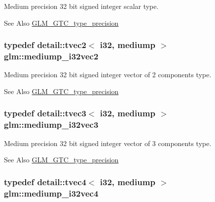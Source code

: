 Medium precision 32 bit signed integer scalar type. \begin{DoxySeeAlso}{See Also}
\hyperlink{group__gtc__type__precision}{G\-L\-M\-\_\-\-G\-T\-C\-\_\-type\-\_\-precision} 
\end{DoxySeeAlso}
\hypertarget{group__gtc__type__precision_gaef7b37956ce9e1cc4faecf21b7fdae8b}{
\subsubsection[{mediump\-\_\-i32vec2}]{\setlength{\rightskip}{0pt plus 5cm}typedef detail\-::tvec2$<$ i32, mediump $>$ {\bf glm\-::mediump\-\_\-i32vec2}}}\label{group__gtc__type__precision_gaef7b37956ce9e1cc4faecf21b7fdae8b}
Medium precision 32 bit signed integer vector of 2 components type. \begin{DoxySeeAlso}{See Also}
\hyperlink{group__gtc__type__precision}{G\-L\-M\-\_\-\-G\-T\-C\-\_\-type\-\_\-precision} 
\end{DoxySeeAlso}
\hypertarget{group__gtc__type__precision_ga768e62b66086bd85a438341eedfad651}{
\subsubsection[{mediump\-\_\-i32vec3}]{\setlength{\rightskip}{0pt plus 5cm}typedef detail\-::tvec3$<$ i32, mediump $>$ {\bf glm\-::mediump\-\_\-i32vec3}}}\label{group__gtc__type__precision_ga768e62b66086bd85a438341eedfad651}
Medium precision 32 bit signed integer vector of 3 components type. \begin{DoxySeeAlso}{See Also}
\hyperlink{group__gtc__type__precision}{G\-L\-M\-\_\-\-G\-T\-C\-\_\-type\-\_\-precision} 
\end{DoxySeeAlso}
\hypertarget{group__gtc__type__precision_ga68126328090f37655d8218c5a5fb8ae5}{
\subsubsection[{mediump\-\_\-i32vec4}]{\setlength{\rightskip}{0pt plus 5cm}typedef detail\-::tvec4$<$ i32, mediump $>$ {\bf glm\-::mediump\-\_\-i32vec4}}}\label{group__gtc__type__precision_ga68126328090f37655d8218c5a5fb8ae5}
